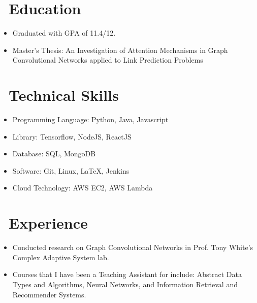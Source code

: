 \documentclass{resume}
\begin{document}



\section{\faGraduationCap\ Education}
\begin{itemize}
	\item Graduated with GPA of 11.4/12.
	\item Master's Thesis: An Investigation of Attention Mechanisms in Graph Convolutional Networks applied to Link Prediction Problems
\end{itemize}
 


\section{\faCogs\ Technical Skills}
\begin{itemize}
	\item Programming Language: Python, Java, Javascript
	\item Library: Tensorflow, NodeJS, ReactJS
	\item Database: SQL, MongoDB
	\item Software: Git, Linux, \LaTeX, Jenkins
	\item Cloud Technology: AWS EC2, AWS Lambda
\end{itemize}

\section{\faCogs\ Experience}
\begin{itemize}
	\item Conducted research on Graph Convolutional Networks in Prof. Tony White's Complex Adaptive System lab.
	\item Courses that I have been a Teaching Assistant for include: Abstract Data Types and Algorithms, Neural Networks, and Information Retrieval and Recommender Systems.
\end{itemize}
\end{document}
